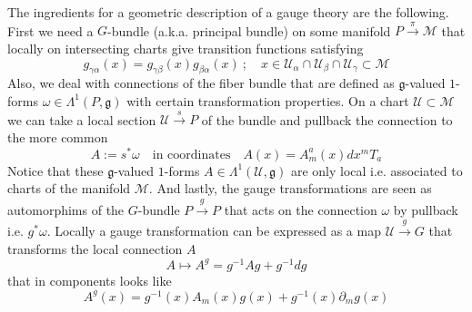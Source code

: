 \documentclass[a4paper,12pt]{article}
\numberwithin{equation}{section}
\numberwithin{thm}{section}
\numberwithin{exm}{section}
\newcommand{\M}{\mathcal M}
\newcommand{\U}{{\mathcal U}}
\newcommand{\p}{\partial}
\newcommand{\<}{{\langle}}
\renewcommand{\>}{{\rangle}}
\renewcommand{\a}{{\alpha}}
\renewcommand{\b}{{\beta}}
\newcommand{\g}{{\gamma}}
\renewcommand{\L}{{\Lambda}}
\newcommand{\om}{{\omega}}
\begin{document}
The ingredients for a geometric description of a gauge theory are the following. First we need a $G$-bundle (a.k.a. principal bundle) on some manifold $P\overset{\pi}{\rightarrow} {\mathcal M}$ that locally on intersecting charts give transition functions satisfying
	\begin{equation}
	g_{\g\a}(x) = g_{\g\b}(x) g_{\b\a}(x)\ ;\quad x\in\U_\a\cap\U_\b\cap\U_\g\subset\M
	\end{equation}
Also, we deal with connections of the fiber bundle that are defined as ${\mathfrak g}$-valued $1$-forms $\om\in\L^1(P,\mathfrak g)$ with certain transformation properties. On a chart ${\mathcal U}\subset{\mathcal M}$ we can take a local section ${\mathcal U}\overset{s}{\rightarrow}P$ of the bundle and pullback the connection to the more common
	\begin{equation}
	A := s^* \om\quad\text{in coordinates}\quad A(x) = A_{m}^a(x) dx^m T_a
	\end{equation}
Notice that these $\mathfrak g$-valued $1$-forms $A\in\L^1(\mathcal U,\mathfrak g)$ are only local i.e. associated to charts of the manifold $\mathcal M$. And lastly, the gauge transformations are seen as automorphims of the $G$-bundle $P\overset{g}{\rightarrow} P$ that acts on the connection $\om$ by pullback i.e. $g^* \om$. Locally a gauge transformation can be expressed as a map $\U\overset{g}{\rightarrow}G$ that transforms the local connection $A$
	\begin{equation}
	A\mapsto A^g =  g^{-1} A g + g^{-1} d g
	\end{equation}
that in components looks like
	\begin{equation}
	A^g(x) = g^{-1}(x) A_m(x) g(x) + g^{-1}(x)\p_m g(x)
	\end{equation}
\end{document}

